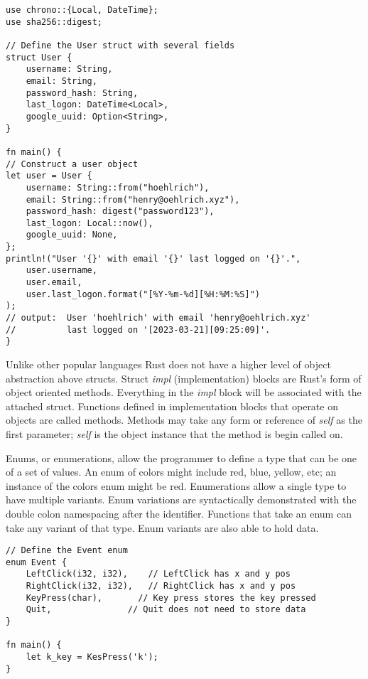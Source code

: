 \documentclass[12pt]{article}
\begin{document}
\singlespacing{}
\begin{verbatim}
use chrono::{Local, DateTime};
use sha256::digest;

// Define the User struct with several fields
struct User {
    username: String,
    email: String,
    password_hash: String,
    last_logon: DateTime<Local>,
    google_uuid: Option<String>,
}

fn main() {
// Construct a user object
let user = User {
    username: String::from("hoehlrich"),
    email: String::from("henry@oehlrich.xyz"),
    password_hash: digest("password123"),
    last_logon: Local::now(),
    google_uuid: None,
};
println!("User '{}' with email '{}' last logged on '{}'.",
    user.username,
    user.email,
    user.last_logon.format("[%Y-%m-%d][%H:%M:%S]")
);
// output:  User 'hoehlrich' with email 'henry@oehlrich.xyz'
//          last logged on '[2023-03-21][09:25:09]'.
}
\end{verbatim}
\doublespacing{}

Unlike other popular languages Rust does not have a higher level of object
abstraction above structs. Struct \textit{impl} (implementation) blocks are
Rust's form of object oriented methods. Everything in the \textit{impl} block
will be associated with the attached struct. Functions defined in
implementation blocks that operate on objects are called methods. Methods may
take any form or reference of \textit{self} as the first parameter;
\textit{self} is the object instance that the method is begin called on.

Enums, or enumerations, allow the programmer to define a type that can be one
of a set of values. An enum of colors might include red, blue, yellow, etc; an
instance of the colors enum might be red. Enumerations allow a single type to
have multiple variants. Enum variations are syntactically demonstrated with the double
colon namespacing after the identifier. Functions that take an enum can take
any variant of that type. Enum variants are also able to hold data.

\singlespacing{}
\begin{verbatim}
// Define the Event enum
enum Event {
    LeftClick(i32, i32),    // LeftClick has x and y pos
    RightClick(i32, i32),   // RightClick has x and y pos
    KeyPress(char),       // Key press stores the key pressed
    Quit,               // Quit does not need to store data
}

fn main() {
    let k_key = KesPress('k');
}
\end{verbatim}
\doublespacing{}
\end{document}
